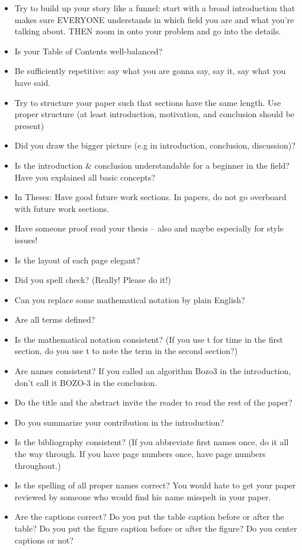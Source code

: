 \begin{itemize}
\item Try to build up your story like a funnel: start with a broad introduction that makes sure EVERYONE understands in which field you are and what you're talking about. THEN zoom in onto your problem and go into the details.
\item Is your Table of Contents well-balanced?
\item Be sufficiently repetitive: say what you are gonna say, say it, say what you have said.
\item Try to structure your paper such that sections have the same length. Use proper structure (at least introduction, motivation, and conclusion should be present)
\item Did you draw the bigger picture (e.g in introduction, conclusion, discussion)?
\item Is the introduction \& conclusion understandable for a beginner in the field? Have you explained all basic concepts?
\item In Theses: Have good future work sections. In papers, do not go overboard with future work sections.
\item Have someone proof read your thesis -- also and maybe especially for style issues!
\item Is the layout of each page elegant?
\item Did you spell check? (Really! Please do it!)
\item Can you replace some mathematical notation by plain English?
\item Are all terms defined?
\item Is the mathematical notation consistent? (If you use t for time in the first section, do you use t to note the term in the second section?)
\item Are names consistent? If you called an algorithm Bozo3 in the introduction, don’t call it BOZO-3 in the conclusion.
\item Do the title and the abstract invite the reader to read the rest of the paper?
\item Do you summarize your contribution in the introduction?
\item Is the bibliography consistent? (If you abbreviate first names once, do it all the way through. If you have page numbers once, have page numbers throughout.)
\item Is the spelling of all proper names correct? You would hate to get your paper reviewed by someone who would find his name misspelt in your paper.
\item Are the captions correct? Do you put the table caption before or after the table? Do you put the figure caption before or after the figure? Do you center captions or not?

\end{itemize}
